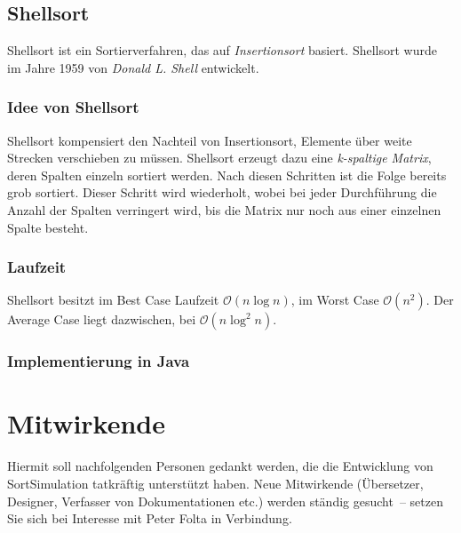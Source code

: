 \documentclass[german]{pfBook}
\newcommand{\OO}{\mathcal{O}}
\begin{document}
	
	
	\subsection{Shellsort}
	
	Shellsort ist ein Sortierverfahren, das auf \emph{Insertionsort} basiert. Shellsort wurde im Jahre 1959 von \emph{Donald L. Shell} entwickelt.
	
	\subsubsection{Idee von Shellsort}
	
	Shellsort kompensiert den Nachteil von Insertionsort, Elemente über weite Strecken verschieben zu müssen. Shellsort erzeugt dazu eine \emph{k-spaltige Matrix}, deren Spalten einzeln sortiert werden. Nach diesen Schritten ist die Folge bereits grob sortiert. Dieser Schritt wird wiederholt, wobei bei jeder Durchführung die Anzahl der Spalten verringert wird, bis die Matrix nur noch aus einer einzelnen Spalte besteht.
	
	\subsubsection{Laufzeit}
	
	Shellsort besitzt im Best Case Laufzeit $\OO(n \log n)$, im Worst Case $\OO(n^2)$. Der Average Case liegt dazwischen, bei $\OO(n \log^2 n)$.
	
	\subsubsection{Implementierung in Java}
	
	
	
	\section{Mitwirkende}
	
	Hiermit soll nachfolgenden Personen gedankt werden, die die Entwicklung von SortSimulation tatkräftig unterstützt haben. Neue Mitwirkende (Übersetzer, Designer, Verfasser von Dokumentationen etc.) werden ständig gesucht~-- setzen Sie sich bei Interesse mit Peter Folta in Verbindung.
	
\end{document}
